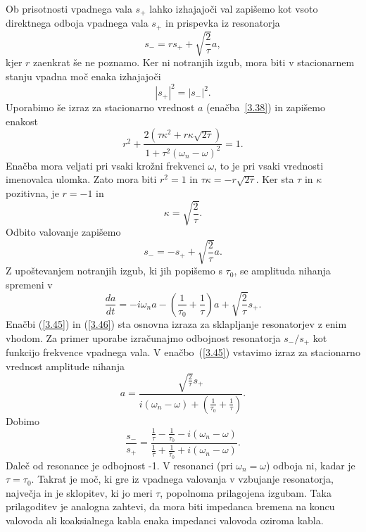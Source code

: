Ob prisotnosti vpadnega vala $s_{+}$ lahko izhajajoči val zapišemo kot
vsoto direktnega odboja vpadnega vala $s_{+}$ in prispevka iz resonatorja
\begin{equation}
s_{-}=rs_{+}+\sqrt{\frac{2}{\tau}}a,
\label{3.41}
\end{equation}
kjer $r$ zaenkrat še ne poznamo. Ker ni notranjih izgub, mora biti v 
stacionarnem stanju vpadna moč enaka izhajajoči
\begin{equation}
|s_{+}|^{2}=|s_{-}|^{2}.
\label{3.42}
\end{equation}
Uporabimo še izraz za stacionarno vrednost $a$  (enačba~\ref{3.38}) in zapišemo
enakost 
\begin{equation}
r^{2}+\frac{2(\tau\kappa^{2}+r\kappa\sqrt{2\tau})}{1+\tau^{2}(\omega_{n}-\omega)^{2}}=1.
\label{3.43}
\end{equation}
Enačba mora veljati pri vsaki krožni  frekvenci $\omega$, to je pri vsaki vrednosti imenovalca
ulomka. Zato mora biti $r^{2}=1$ in $\tau\kappa=-r\sqrt{2\tau}$.
Ker sta $\tau$ in $\kappa$ pozitivna, je $r=-1$ in 
\begin{equation}
\kappa=\sqrt{\frac{2}{\tau}}.
\label{3.44}
\end{equation}
 Odbito valovanje zapišemo 
\begin{equation}
s_{-}=-s_{+}+\sqrt{\frac{2}{\tau}}a.
\label{3.45}
\end{equation}
Z upoštevanjem notranjih izgub, ki jih popišemo s $\tau_0$, se amplituda nihanja spremeni v 
\begin{equation}
\frac{da}{dt}=-i\omega_{n}a-\left(\frac{1}{\tau_{0}}+\frac{1}{\tau}\right)a+
\sqrt{\frac{2}{\tau}}s_{+}.
\label{3.46}
\end{equation}
 Enačbi (\ref{3.45}) in (\ref{3.46}) sta osnovna izraza za sklapljanje
resonatorjev z enim vhodom. Za primer uporabe izračunajmo odbojnost
resonatorja $s_{-}/s_{+}$ kot funkcijo frekvence vpadnega vala. V
enačbo~(\ref{3.45}) vstavimo izraz za stacionarno vrednost amplitude
nihanja 
\begin{equation}
a=\frac{\sqrt{\frac{2}{\tau}}s_{+}}{i(\omega_{n}-\omega)+(\frac{1}{\tau_{0}}+
\frac{1}{\tau})}.
\label{3.47}
\end{equation}
Dobimo
\begin{equation}
\frac{s_{-}}{s_{+}}=\frac{\frac{1}{\tau}-\frac{1}{\tau_0}-i(\omega_{n}-\omega)}
{\frac{1}{\tau}
+\frac{1}{\tau_0}+i(\omega_{n}-\omega)}.
\label{3.48}
\end{equation}
Daleč od resonance je odbojnost -1. V resonanci (pri $\omega_{n}=\omega$)
odboja ni, kadar je $\tau=\tau_{0}$. Takrat je moč, ki gre iz
vpadnega valovanja v vzbujanje resonatorja, največja in je sklopitev,
ki jo meri $\tau$, popolnoma prilagojena izgubam. Taka prilagoditev
je analogna zahtevi, da mora biti impedanca bremena na koncu valovoda
ali koaksialnega kabla enaka impedanci valovoda oziroma kabla.


